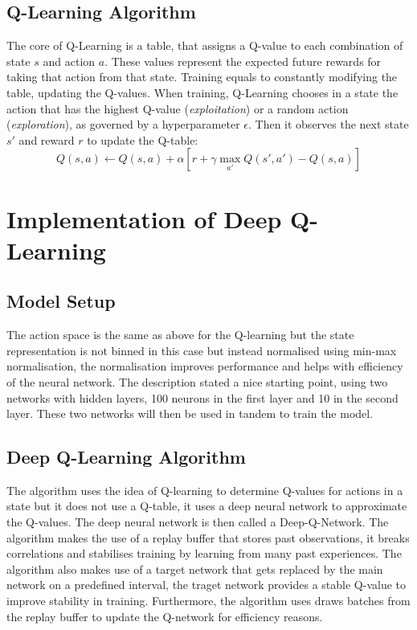 \documentclass[a4paper,12pt]{article}
\begin{document}
\subsection{Q-Learning Algorithm}
The core of Q-Learning is a table, that assigns a Q-value to each combination of state \(s\) and action \(a\). These values represent the expected future
rewards for taking that action from that state. Training equals to constantly modifying the table, updating the Q-values. When training, Q-Learning chooses in a state
the action that has the highest Q-value (\textit{exploitation}) or a random action (\textit{exploration}), as governed by a hyperparameter \(\epsilon\).
Then it observes the next state \(s'\) and reward \(r\) to update the Q-table:
$$
Q(s, a) \leftarrow Q(s, a) + \alpha \left[ r + \gamma \max_{a'} Q(s', a') - Q(s, a) \right]
$$

\section{Implementation of Deep Q-Learning}
\subsection{Model Setup}
The action space is the same as above for the Q-learning but the state representation is not binned in this case but instead normalised using min-max normalisation, the normalisation improves performance and helps with efficiency of the neural network.
The description stated a nice starting point, using two networks with hidden layers, 100 neurons in the first layer and 10 in the second layer. 
These two networks will then be used in tandem to train the model.

\subsection{Deep Q-Learning Algorithm}
The algorithm uses the idea of Q-learning to determine Q-values for actions in a state but it does not use a Q-table, it uses a deep neural network to approximate the Q-values.
The deep neural network is then called a Deep-Q-Network. 
The algorithm makes the use of a replay buffer that stores past observations, it breaks correlations and stabilises training by learning from many past experiences. 
The algorithm also makes use of a target network that gets replaced by the main network on a predefined interval, the traget network provides a stable Q-value to improve stability in training.
Furthermore, the algorithm uses draws batches from the replay buffer to update the Q-network for efficiency reasons.
\end{document}
